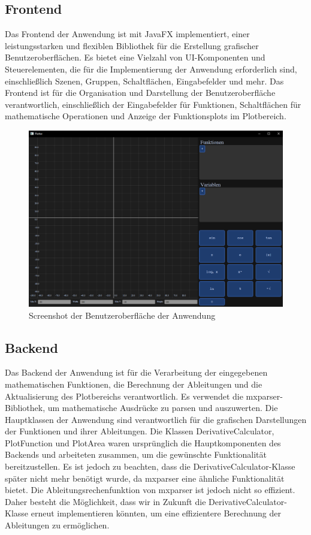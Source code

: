 \documentclass[a4paper]{article}
\begin{document}
\subsection{Frontend}

Das Frontend der Anwendung ist mit JavaFX implementiert, einer leistungsstarken und flexiblen Bibliothek für die Erstellung grafischer Benutzeroberflächen. Es bietet eine Vielzahl von UI-Komponenten und Steuerelementen, die für die Implementierung der Anwendung erforderlich sind, einschließlich Szenen, Gruppen, Schaltflächen, Eingabefelder und mehr. Das Frontend ist für die Organisation und Darstellung der Benutzeroberfläche verantwortlich, einschließlich der Eingabefelder für Funktionen, Schaltflächen für mathematische Operationen und Anzeige der Funktionsplots im Plotbereich.

\begin{figure}[h]
	\centering
	\includegraphics[width=\textwidth]{Resources/gui_screenshot.png}
	\caption{Screenshot der Benutzeroberfläche der Anwendung}
	\label{fig:gui_screenshot}
\end{figure}

\newpage

\subsection{Backend}

Das Backend der Anwendung ist für die Verarbeitung der eingegebenen mathematischen Funktionen, die Berechnung der Ableitungen und die Aktualisierung des Plotbereichs verantwortlich. Es verwendet die mxparser-Bibliothek, um mathematische Ausdrücke zu parsen und auszuwerten. Die Hauptklassen der Anwendung sind verantwortlich für die grafischen Darstellungen der Funktionen und ihrer Ableitungen. Die Klassen DerivativeCalculator, PlotFunction und PlotArea waren ursprünglich die Hauptkomponenten des Backends und arbeiteten zusammen, um die gewünschte Funktionalität bereitzustellen. Es ist jedoch zu beachten, dass die DerivativeCalculator-Klasse später nicht mehr benötigt wurde, da mxparser eine ähnliche Funktionalität bietet. Die Ableitungsrechenfunktion von mxparser ist jedoch nicht so effizient. Daher besteht die Möglichkeit, dass wir in Zukunft die DerivativeCalculator-Klasse erneut implementieren könnten, um eine effizientere Berechnung der Ableitungen zu ermöglichen.
\end{document}
